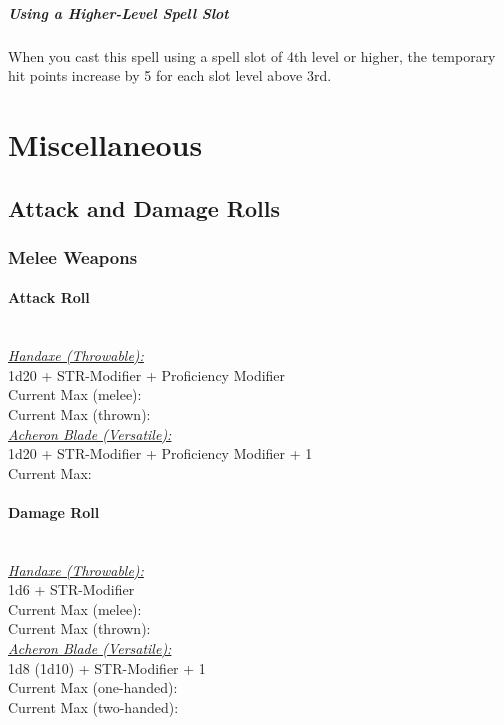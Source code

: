 \documentclass[letterpaper,openany,oneside,twocolumn]{book}
\begin{document}
\subparagraph*{Using a Higher-Level Spell Slot} When you cast this spell using a spell slot of 4th level or higher, the temporary hit points increase by 5 for each slot level above 3rd.

\section*{Miscellaneous}
\subsection*{Attack and Damage Rolls}
\subsubsection*{Melee Weapons}
\paragraph*{Attack Roll}\hfill\\
\underline{\textit{Handaxe (Throwable):}}\\
1d20 + STR-Modifier + Proficiency Modifier\\
\indent Current Max (melee): \\
\indent Current Max (thrown): 
\\
\underline{\textit{Acheron Blade (Versatile):}}\\
1d20 + STR-Modifier + Proficiency Modifier + 1\\
\indent Current Max: 
\paragraph*{Damage Roll}\hfill\\
\underline{\textit{Handaxe (Throwable):}}\\
1d6 + STR-Modifier\\
\indent Current Max (melee): \\
\indent Current Max (thrown): 
\\
\underline{\textit{Acheron Blade (Versatile):}}\\
1d8 (1d10) + STR-Modifier + 1\\
\indent Current Max (one-handed): \\
\indent Current Max (two-handed): 
\end{document}

